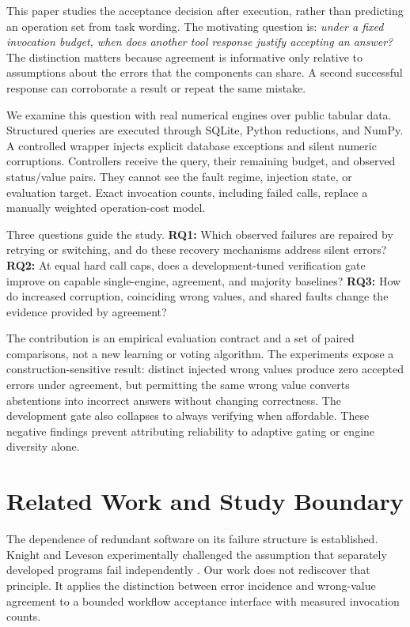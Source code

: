 \documentclass{svproc}
\begin{document}
This paper studies the acceptance decision after execution, rather than predicting an operation set from task wording. The motivating question is: \emph{under a fixed invocation budget, when does another tool response justify accepting an answer?} The distinction matters because agreement is informative only relative to assumptions about the errors that the components can share. A second successful response can corroborate a result or repeat the same mistake.

We examine this question with real numerical engines over public tabular data. Structured queries are executed through SQLite, Python reductions, and NumPy. A controlled wrapper injects explicit database exceptions and silent numeric corruptions. Controllers receive the query, their remaining budget, and observed status/value pairs. They cannot see the fault regime, injection state, or evaluation target. Exact invocation counts, including failed calls, replace a manually weighted operation-cost model.

Three questions guide the study. \textbf{RQ1:} Which observed failures are repaired by retrying or switching, and do these recovery mechanisms address silent errors? \textbf{RQ2:} At equal hard call caps, does a development-tuned verification gate improve on capable single-engine, agreement, and majority baselines? \textbf{RQ3:} How do increased corruption, coinciding wrong values, and shared faults change the evidence provided by agreement?

The contribution is an empirical evaluation contract and a set of paired comparisons, not a new learning or voting algorithm. The experiments expose a construction-sensitive result: distinct injected wrong values produce zero accepted errors under agreement, but permitting the same wrong value converts abstentions into incorrect answers without changing correctness. The development gate also collapses to always verifying when affordable. These negative findings prevent attributing reliability to adaptive gating or engine diversity alone.

\section{Related Work and Study Boundary}
The dependence of redundant software on its failure structure is established. Knight and Leveson experimentally challenged the assumption that separately developed programs fail independently \cite{knight1986}. Our work does not rediscover that principle. It applies the distinction between error incidence and wrong-value agreement to a bounded workflow acceptance interface with measured invocation counts.
\end{document}
